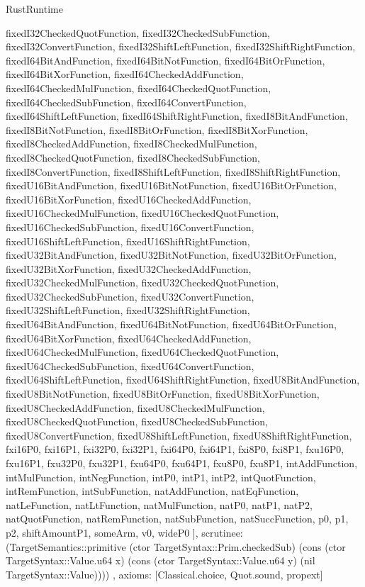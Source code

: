 \begin{lexlean}{RustRuntime}
\begin{semanticmodule}
{{      fixedI32CheckedQuotFunction,
      fixedI32CheckedSubFunction,
      fixedI32ConvertFunction,
      fixedI32ShiftLeftFunction,
      fixedI32ShiftRightFunction,
      fixedI64BitAndFunction,
      fixedI64BitNotFunction,
      fixedI64BitOrFunction,
      fixedI64BitXorFunction,
      fixedI64CheckedAddFunction,
      fixedI64CheckedMulFunction,
      fixedI64CheckedQuotFunction,
      fixedI64CheckedSubFunction,
      fixedI64ConvertFunction,
      fixedI64ShiftLeftFunction,
      fixedI64ShiftRightFunction,
      fixedI8BitAndFunction,
      fixedI8BitNotFunction,
      fixedI8BitOrFunction,
      fixedI8BitXorFunction,
      fixedI8CheckedAddFunction,
      fixedI8CheckedMulFunction,
      fixedI8CheckedQuotFunction,
      fixedI8CheckedSubFunction,
      fixedI8ConvertFunction,
      fixedI8ShiftLeftFunction,
      fixedI8ShiftRightFunction,
      fixedU16BitAndFunction,
      fixedU16BitNotFunction,
      fixedU16BitOrFunction,
      fixedU16BitXorFunction,
      fixedU16CheckedAddFunction,
      fixedU16CheckedMulFunction,
      fixedU16CheckedQuotFunction,
      fixedU16CheckedSubFunction,
      fixedU16ConvertFunction,
      fixedU16ShiftLeftFunction,
      fixedU16ShiftRightFunction,
      fixedU32BitAndFunction,
      fixedU32BitNotFunction,
      fixedU32BitOrFunction,
      fixedU32BitXorFunction,
      fixedU32CheckedAddFunction,
      fixedU32CheckedMulFunction,
      fixedU32CheckedQuotFunction,
      fixedU32CheckedSubFunction,
      fixedU32ConvertFunction,
      fixedU32ShiftLeftFunction,
      fixedU32ShiftRightFunction,
      fixedU64BitAndFunction,
      fixedU64BitNotFunction,
      fixedU64BitOrFunction,
      fixedU64BitXorFunction,
      fixedU64CheckedAddFunction,
      fixedU64CheckedMulFunction,
      fixedU64CheckedQuotFunction,
      fixedU64CheckedSubFunction,
      fixedU64ConvertFunction,
      fixedU64ShiftLeftFunction,
      fixedU64ShiftRightFunction,
      fixedU8BitAndFunction,
      fixedU8BitNotFunction,
      fixedU8BitOrFunction,
      fixedU8BitXorFunction,
      fixedU8CheckedAddFunction,
      fixedU8CheckedMulFunction,
      fixedU8CheckedQuotFunction,
      fixedU8CheckedSubFunction,
      fixedU8ConvertFunction,
      fixedU8ShiftLeftFunction,
      fixedU8ShiftRightFunction,
      fxi16P0,
      fxi16P1,
      fxi32P0,
      fxi32P1,
      fxi64P0,
      fxi64P1,
      fxi8P0,
      fxi8P1,
      fxu16P0,
      fxu16P1,
      fxu32P0,
      fxu32P1,
      fxu64P0,
      fxu64P1,
      fxu8P0,
      fxu8P1,
      intAddFunction,
      intMulFunction,
      intNegFunction,
      intP0,
      intP1,
      intP2,
      intQuotFunction,
      intRemFunction,
      intSubFunction,
      natAddFunction,
      natEqFunction,
      natLeFunction,
      natLtFunction,
      natMulFunction,
      natP0,
      natP1,
      natP2,
      natQuotFunction,
      natRemFunction,
      natSubFunction,
      natSuccFunction,
      p0,
      p1,
      p2,
      shiftAmountP1,
      someArm,
      v0,
      wideP0
    ],
    scrutinee: (TargetSemantics::primitive (ctor TargetSyntax::Prim.checkedSub) (cons (ctor TargetSyntax::Value.u64 x) (cons (ctor TargetSyntax::Value.u64 y) (nil TargetSyntax::Value))))
  },
  axioms: [Classical.choice, Quot.sound, propext]
}


\end{semanticmodule}
\end{lexlean}
